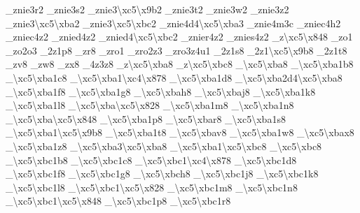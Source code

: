 \begin{DoxyCompactItemize}
\-\_\-znie3r2 \-\_\-znie3s2 \-\_\-znie3\textbackslash{}xc5\textbackslash{}x9b2 \-\_\-znie3t2 \-\_\-znie3w2 \-\_\-znie3z2 \-\_\-znie3\textbackslash{}xc5\textbackslash{}xba2 \-\_\-znie3\textbackslash{}xc5\textbackslash{}xbc2 \-\_\-znie4d4\textbackslash{}xc5\textbackslash{}xba3 \-\_\-znie4m3c \-\_\-zniec4h2 \-\_\-zniec4z2 \-\_\-znied4z2 \-\_\-znied4\textbackslash{}xc5\textbackslash{}xbc2 \-\_\-znier4z2 \-\_\-znies4z2 \-\_\-z\textbackslash{}xc5\textbackslash{}x848 \-\_\-zo1 \-\_\-zo2o3 \-\_\-2z1p8 \-\_\-zr8 \-\_\-zro1 \-\_\-zro2z3 \-\_\-zro3z4u1 \-\_\-2z1s8 \-\_\-2z1\textbackslash{}xc5\textbackslash{}x9b8 \-\_\-2z1t8 \-\_\-zv8 \-\_\-zw8 \-\_\-zx8 \-\_\-4z3z8 \-\_\-z\textbackslash{}xc5\textbackslash{}xba8 \-\_\-z\textbackslash{}xc5\textbackslash{}xbc8 \-\_\-\textbackslash{}xc5\textbackslash{}xba8 \-\_\textbackslash{}xc5\textbackslash{}xba1b8 \-\_\textbackslash{}xc5\textbackslash{}xba1c8 \-\_\textbackslash{}xc5\textbackslash{}xba1\textbackslash{}xc4\textbackslash{}x878 \-\_\textbackslash{}xc5\textbackslash{}xba1d8 \-\_\-\textbackslash{}xc5\textbackslash{}xba2d4\textbackslash{}xc5\textbackslash{}xba8 \-\_\textbackslash{}xc5\textbackslash{}xba1f8 \-\_\textbackslash{}xc5\textbackslash{}xba1g8 \-\_\-\textbackslash{}xc5\textbackslash{}xbah8 \-\_\-\textbackslash{}xc5\textbackslash{}xbaj8 \-\_\textbackslash{}xc5\textbackslash{}xba1k8 \-\_\textbackslash{}xc5\textbackslash{}xba1l8 \-\_\-\textbackslash{}xc5\textbackslash{}xba\textbackslash{}xc5\textbackslash{}x828 \-\_\textbackslash{}xc5\textbackslash{}xba1m8 \-\_\textbackslash{}xc5\textbackslash{}xba1n8 \-\_\-\textbackslash{}xc5\textbackslash{}xba\textbackslash{}xc5\textbackslash{}x848 \-\_\textbackslash{}xc5\textbackslash{}xba1p8 \-\_\-\textbackslash{}xc5\textbackslash{}xbar8 \-\_\textbackslash{}xc5\textbackslash{}xba1s8 \-\_\textbackslash{}xc5\textbackslash{}xba1\textbackslash{}xc5\textbackslash{}x9b8 \-\_\textbackslash{}xc5\textbackslash{}xba1t8 \-\_\-\textbackslash{}xc5\textbackslash{}xbav8 \-\_\textbackslash{}xc5\textbackslash{}xba1w8 \-\_\-\textbackslash{}xc5\textbackslash{}xbax8 \-\_\textbackslash{}xc5\textbackslash{}xba1z8 \-\_\textbackslash{}xc5\textbackslash{}xba3\textbackslash{}xc5\textbackslash{}xba8 \-\_\textbackslash{}xc5\textbackslash{}xba1\textbackslash{}xc5\textbackslash{}xbc8 \-\_\-\textbackslash{}xc5\textbackslash{}xbc8 \-\_\textbackslash{}xc5\textbackslash{}xbc1b8 \-\_\textbackslash{}xc5\textbackslash{}xbc1c8 \-\_\textbackslash{}xc5\textbackslash{}xbc1\textbackslash{}xc4\textbackslash{}x878 \-\_\textbackslash{}xc5\textbackslash{}xbc1d8 \-\_\textbackslash{}xc5\textbackslash{}xbc1f8 \-\_\textbackslash{}xc5\textbackslash{}xbc1g8 \-\_\-\textbackslash{}xc5\textbackslash{}xbch8 \-\_\textbackslash{}xc5\textbackslash{}xbc1j8 \-\_\textbackslash{}xc5\textbackslash{}xbc1k8 \-\_\textbackslash{}xc5\textbackslash{}xbc1l8 \-\_\textbackslash{}xc5\textbackslash{}xbc1\textbackslash{}xc5\textbackslash{}x828 \-\_\textbackslash{}xc5\textbackslash{}xbc1m8 \-\_\textbackslash{}xc5\textbackslash{}xbc1n8 \-\_\textbackslash{}xc5\textbackslash{}xbc1\textbackslash{}xc5\textbackslash{}x848 \-\_\textbackslash{}xc5\textbackslash{}xbc1p8 \-\_\textbackslash{}xc5\textbackslash{}xbc1r8 
\end{DoxyCompactItemize}
